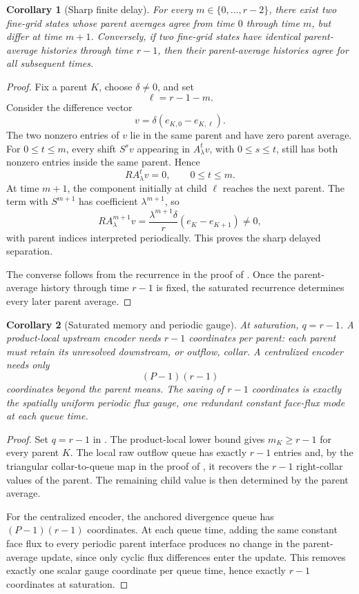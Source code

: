 \documentclass[preprint,12pt]{elsarticle}
\theoremstyle{plain}
\newtheorem{corollary}{Corollary}
\theoremstyle{remark}
\theoremstyle{definition}
\begin{document}
\begin{corollary}[Sharp finite delay]
\label{cor:sharp-delay}
For every \(m\in\{0,\ldots,r-2\}\), there exist two fine-grid states whose
parent averages agree from time \(0\) through time \(m\), but differ at time
\(m+1\).  Conversely, if two fine-grid states have identical parent-average
histories through time \(r-1\), then their parent-average histories agree for
all subsequent times.
\end{corollary}

\begin{proof}
Fix a parent \(K\), choose \(\delta\ne0\), and set
\[
  \ell=r-1-m.
\]
Consider the difference vector
\[
  v=\delta(e_{K,0}-e_{K,\ell}).
\]
The two nonzero entries of \(v\) lie in the same parent and have zero parent
average.  For \(0\le t\le m\), every shift \(S^s v\) appearing in
\(A_\lambda^t v\), with \(0\le s\le t\), still has both nonzero entries
inside the same parent.  Hence
\[
  RA_\lambda^t v=0,
  \qquad
  0\le t\le m.
\]
At time \(m+1\), the component initially at child \(\ell\) reaches the next
parent.  The term with \(S^{m+1}\) has coefficient \(\lambda^{m+1}\), so
\[
  RA_\lambda^{m+1}v
  =
  \frac{\lambda^{m+1}\delta}{r}
  (e_K-e_{K+1})
  \ne0,
\]
with parent indices interpreted periodically.  This proves the sharp delayed
separation.

The converse follows from the recurrence in the proof of .
Once the parent-average history through time \(r-1\) is fixed, the saturated
recurrence determines every later parent average.
\end{proof}

\begin{corollary}[Saturated memory and periodic gauge]
\label{cor:gauge}
At saturation, \(q=r-1\).  A product-local upstream encoder needs \(r-1\)
coordinates per parent: each parent must retain its unresolved downstream,
or outflow, collar.  A centralized encoder needs only
\[
  (P-1)(r-1)
\]
coordinates beyond the parent means.  The saving of \(r-1\) coordinates is
exactly the spatially uniform periodic flux gauge, one redundant constant
face-flux mode at each queue time.
\end{corollary}

\begin{proof}
Set \(q=r-1\) in .  The product-local lower bound gives
\(m_K\ge r-1\) for every parent \(K\).  The local raw outflow queue has
exactly \(r-1\) entries and, by the triangular collar-to-queue map in the
proof of , it recovers the \(r-1\) right-collar values of the
parent.  The remaining child value is then determined by the parent average.

For the centralized encoder, the anchored divergence queue has
\((P-1)(r-1)\) coordinates.  At each queue time, adding the same constant
face flux to every periodic parent interface produces no change in the
parent-average update, since only cyclic flux differences enter the update.
This removes exactly one scalar gauge coordinate per queue time, hence
exactly \(r-1\) coordinates at saturation.
\end{proof}
\end{document}
